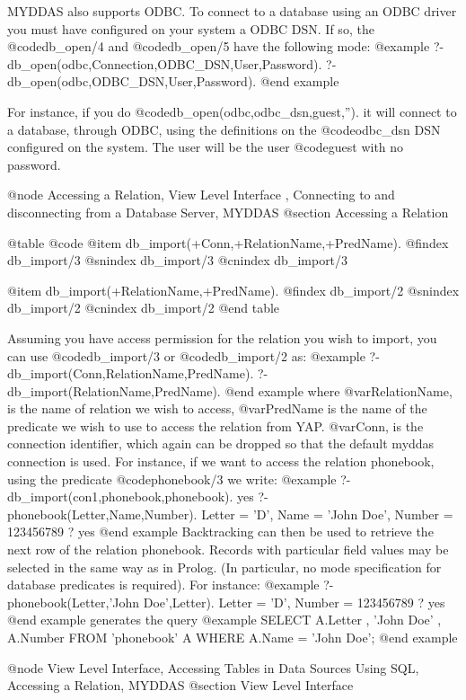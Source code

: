 {{{{{{{{{MYDDAS also supports ODBC. To connect to a database using an ODBC driver
you must have configured on your system a ODBC DSN. If so, the @code{db_open/4}
and @code{db_open/5} have the following mode:
@example
 ?- db_open(odbc,Connection,ODBC_DSN,User,Password). 
 ?- db_open(odbc,ODBC_DSN,User,Password).
@end example

For instance, if you do @code{db_open(odbc,odbc_dsn,guest,'')}. it will connect
to a database, through ODBC, using the definitions on the @code{odbc_dsn} DSN
configured on the system. The user will be the user @code{guest} with no
password.

@node Accessing a Relation, View Level Interface , Connecting to and disconnecting from a Database Server, MYDDAS 
@section Accessing a Relation

@table @code
@item db_import(+Conn,+RelationName,+PredName). 
@findex db_import/3
@snindex db_import/3
@cnindex db_import/3

@item db_import(+RelationName,+PredName).  
@findex db_import/2
@snindex db_import/2
@cnindex db_import/2
@end table

Assuming you have access permission for the relation you wish to import,
you can use @code{db_import/3} or @code{db_import/2} as:
@example
?- db_import(Conn,RelationName,PredName).
?- db_import(RelationName,PredName).
@end example
 where @var{RelationName}, is the name of
relation we wish to access, @var{PredName} is the name of the predicate we
wish to use to access the relation from YAP. @var{Conn}, is the connection
identifier, which again can be dropped so that the default myddas connection
is used. For instance, if we want to access the relation phonebook,
using the predicate @code{phonebook/3} we write: 
@example
?- db_import(con1,phonebook,phonebook). 
yes
?- phonebook(Letter,Name,Number).
Letter = 'D',
Name = 'John Doe',
Number = 123456789 ? 
yes
@end example
Backtracking can then be used to retrieve the next row
of the relation phonebook.  Records with particular field values may be
selected in the same way as in Prolog. (In particular, no mode
specification for database predicates is required). For instance: 
@example
?- phonebook(Letter,'John Doe',Letter). 
Letter = 'D', 
Number = 123456789 ?
yes
@end example
generates the query @example
SELECT A.Letter , 'John Doe' , A.Number 
FROM 'phonebook' A 
WHERE A.Name = 'John Doe';
@end example

@node View Level Interface, Accessing Tables in Data Sources Using SQL, Accessing a Relation, MYDDAS
@section View Level Interface

}}}}}}}}}

